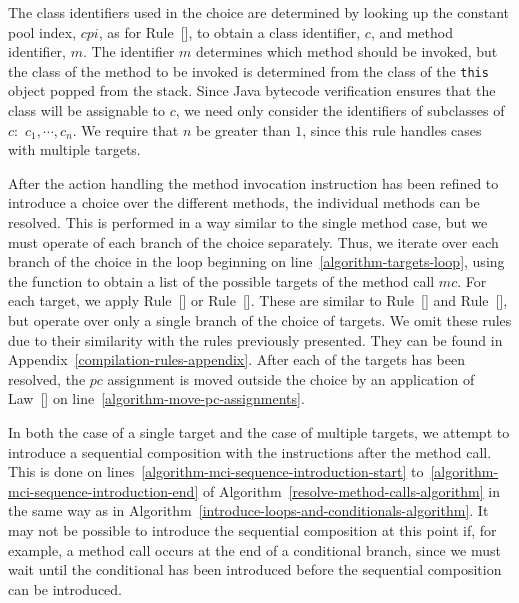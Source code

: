 The class identifiers used in the choice are determined by looking up
the constant pool index, $cpi$, as for Rule~[], to obtain a class identifier, $c$, and method identifier, $m$.
The identifier $m$ determines which method should be invoked, but the
class of the method to be invoked is determined from the class of the
\texttt{this} object popped from the stack.
Since Java bytecode verification ensures that the class will be
assignable to $c$, we need only consider the identifiers of subclasses
of $c$:~$c_1, \cdots , c_n$.
We require that $n$ be greater than $1$, since this rule handles cases
with multiple targets.

After the action handling the method invocation instruction has been
refined to introduce a choice over the different methods, the
individual methods can be resolved.
This is performed in a way similar to the single method case, but we
must operate of each branch of the choice separately.
Thus, we iterate over each branch of the choice in the loop beginning
on line~\ref{algorithm-targets-loop}, using the function
 to obtain a list of the possible targets of the
method call $mc$.
For each target, we apply
Rule~[] or
Rule~[].
These are similar to Rule~[] and
Rule~[], but operate over only a
single branch of the choice of targets.
We omit these rules due to their similarity with the rules previously
presented.
They can be found in Appendix~\ref{compilation-rules-appendix}.
After each of the targets has been resolved, the $pc$ assignment is
moved outside the choice by an application of
Law~[] on
line~\ref{algorithm-move-pc-assignments}.

In both the case of a single target and the case of multiple targets,
we attempt to introduce a sequential composition with the instructions
after the method call.
This is done on lines~\ref{algorithm-mci-sequence-introduction-start}
to~\ref{algorithm-mci-sequence-introduction-end} of
Algorithm~\ref{resolve-method-calls-algorithm} in the same way as in
Algorithm~\ref{introduce-loops-and-conditionals-algorithm}.
It may not be possible to introduce the sequential composition at this
point if, for example, a method call occurs at the end of a
conditional branch, since we must wait until the conditional has been
introduced before the sequential composition can be introduced.

